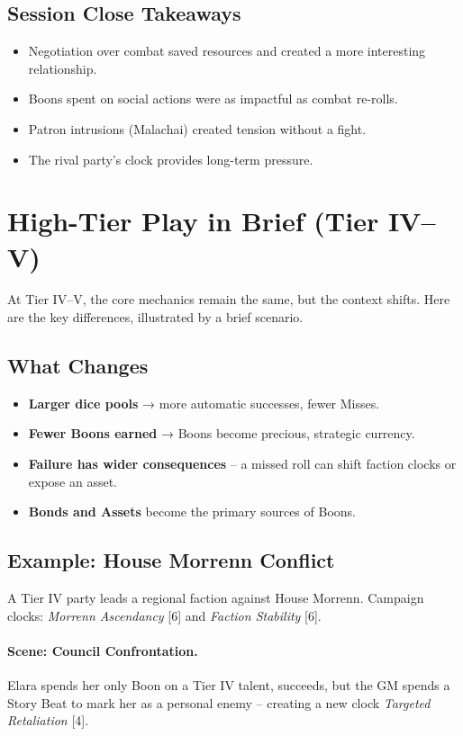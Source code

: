 \subsection*{Session Close Takeaways}
\begin{itemize}
  \item Negotiation over combat saved resources and created a more interesting relationship.
  \item Boons spent on social actions were as impactful as combat re‑rolls.
  \item Patron intrusions (Malachai) created tension without a fight.
  \item The rival party’s clock provides long-term pressure.
\end{itemize}

\section{High-Tier Play in Brief (Tier IV–V)}

At Tier IV–V, the core mechanics remain the same, but the context shifts. Here are the key differences, illustrated by a brief scenario.

\subsection*{What Changes}
\begin{itemize}
  \item \textbf{Larger dice pools} → more automatic successes, fewer Misses.
  \item \textbf{Fewer Boons earned} → Boons become precious, strategic currency.
  \item \textbf{Failure has wider consequences} – a missed roll can shift faction clocks or expose an asset.
  \item \textbf{Bonds and Assets} become the primary sources of Boons.
\end{itemize}

\subsection*{Example: House Morrenn Conflict}
A Tier IV party leads a regional faction against House Morrenn. Campaign clocks: \emph{Morrenn Ascendancy} [6] and \emph{Faction Stability} [6].

\paragraph{Scene: Council Confrontation.} Elara spends her only Boon on a Tier IV talent, succeeds, but the GM spends a Story Beat to mark her as a personal enemy – creating a new clock \emph{Targeted Retaliation} [4].

